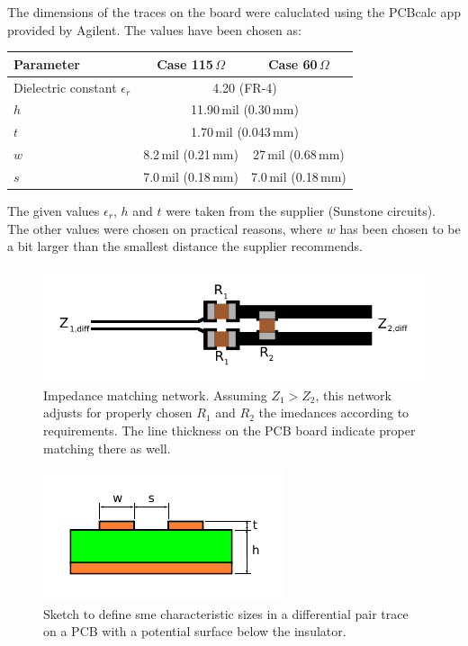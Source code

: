 The dimensions of the traces on the board were caluclated using the PCBcalc app provided by Agilent. The values have been chosen as:
\begin{center}
\begin{tabular}{lcc}
    \toprule %
    Parameter & Case 115\,$\Omega$ & Case 60\,$\Omega$ \\
    \midrule %
    Dielectric constant $\epsilon_r$ & \multicolumn{2}{c}{4.20 (FR-4)} \\
    $h$ & \multicolumn{2}{c}{11.90\,mil (0.30\,mm)} \\
    $t$ & \multicolumn{2}{c}{1.70\,mil (0.043\,mm)} \\
    $w$ & 8.2\,mil (0.21\,mm) & 27\,mil (0.68\,mm) \\
    $s$ & 7.0\,mil (0.18\,mm) & 7.0\,mil (0.18\,mm) \\
    \bottomrule %
\end{tabular}
\end{center}
The given values $\epsilon_r$, $h$ and $t$ were taken from the supplier (Sunstone circuits). The other values were chosen on practical reasons, where $w$ has been chosen to be a bit larger than the smallest distance the supplier recommends.


\begin{figure}[hbtp]
	\begin{center}
	\includegraphics[width=.3\textwidth]{img/impedmatch.pdf}
	\end{center}
	\caption{Impedance matching network. Assuming $Z_1>Z_2$, this network adjusts for properly chosen $R_1$ and $R_2$ the imedances according to requirements. The line thickness on the PCB board indicate proper matching there as well.}
	\label{fig:mpedmatch}
\end{figure}

\begin{figure}[hbtp]
	\begin{center}
	\includegraphics[width=.3\textwidth]{img/diffpair.pdf}
	\end{center}
	\caption{Sketch to define sme characteristic sizes in a differential pair trace on a PCB with a potential surface below the insulator.}
	\label{fig:diffpair}
\end{figure}


